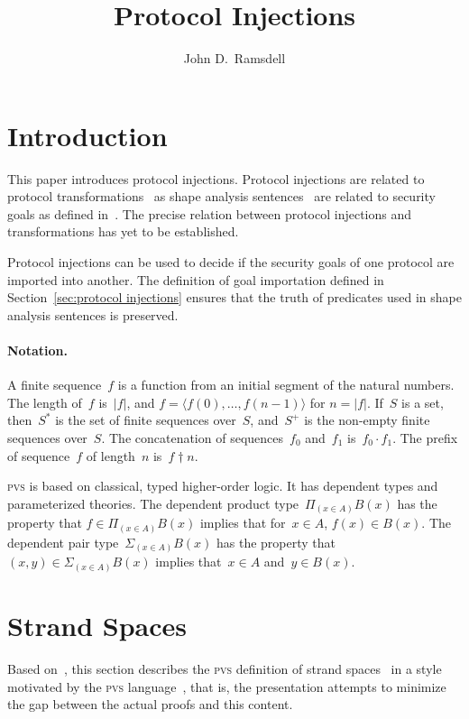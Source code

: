 \documentclass[12pt]{article}
\title{Protocol Injections}
\author{John D.\ Ramsdell}
\newcommand{\pvs}{\textsc{pvs}}
\newcommand{\seq}[1]{\ensuremath{\langle#1\rangle}}
\newcommand{\prefix}[2]{#1\dagger#2}
\newcommand{\append}{\cdot}
\newcommand{\dprod}[1]{\Pi_{(#1)}}
\newcommand{\dpair}[1]{\Sigma_{(#1)}}
\begin{document}
\maketitle

\section{Introduction}

This paper introduces protocol injections.  Protocol injections are
related to protocol transformations~\cite{Guttman12a} as shape
analysis sentences~\cite{Ramsdell12} are related to security goals as
defined in~\cite{Guttman12a}.  The precise relation between protocol
injections and transformations has yet to be established.

Protocol injections can be used to decide if the security goals of one
protocol are imported into another.  The definition of goal
importation defined in Section~\ref{sec:protocol injections} ensures
that the truth of predicates used in shape analysis sentences is
preserved.

\paragraph{Notation.}

A finite sequence~$f$ is a function from an initial segment of the
natural numbers.  The length of~$f$ is~$|f|$, and $f=\seq{f(0),\ldots,
  f(n-1)}$ for $n=|f|$.  If~$S$ is a set, then~$S^\ast$ is the set of
finite sequences over~$S$, and~$S^+$ is the non-empty finite sequences
over~$S$.  The concatenation of sequences~$f_0$ and~$f_1$
is~$f_0\append f_1$.  The prefix of sequence~$f$ of length~$n$
is~$\prefix{f}{n}$.

{\pvs} is based on classical, typed higher-order
logic.  It has dependent types and parameterized theories.
The dependent product type~$\dprod{x\in A}B(x)$ has the property that
$f\in\dprod{x\in A}B(x)$ implies that for~$x\in A$, $f(x)\in B(x)$.
The dependent pair type~$\dpair{x\in A}B(x)$ has the property that
$(x,y)\in\dpair{x\in A}B(x)$ implies that~$x\in A$ and~$y\in B(x)$.

\section{Strand Spaces}\label{sec:strand spaces}

Based on~\cite{cpsaspec09}, this section describes the {\pvs}
definition of strand spaces~\cite{ThayerHerzogGuttman99} in a style
motivated by the {\pvs} language~\cite{cade92-pvs}, that is, the
presentation attempts to minimize the gap between the actual proofs
and this content.
\end{document}
